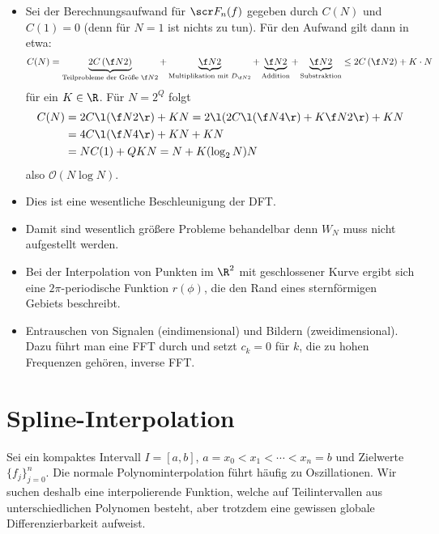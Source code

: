 \documentclass[11pt]{scrbook}
\begin{document}
\begin{nt*}[Aufwandsbetrachtung]
		\begin{itemize}
			\item
				Sei der Berechnungsaufwand für $\scr F_n(f)$ gegeben durch $C(N)$ und $C(1)=0$ (denn für $N=1$ ist nichts zu tun).
				Für den Aufwand gilt dann in etwa:
				\[
					C(N) = \underbrace{2C\left(\f N2\right)}_{\text{Teilprobleme der Größe $\f N2$}} + \underbrace{\f N2}_{\text{Multiplikation mit $D_{\f N2}$}} + \underbrace{\f N2}_{\text{Addition}} + \underbrace{\f N2}_{\text{Substraktion}} \le 2 C\left(\f N2\right) + K\cdot N
				\]
				für ein $K\in \R$.
				Für $N=2^Q$ folgt
				\begin{align*}
					C(N) &= 2C\l(\f N2\r) + KN = 2\l(2C\l(\f N4\r) + K\f N2\r) + KN \\
					&= 4C\l(\f N4\r) + KN + KN \\
					&= NC(1) + QKN = N + K(\log_2 N)N 
				\end{align*}
				also $\mathcal O(N\log N)$.
			\item
				Dies ist eine wesentliche Beschleunigung der DFT.
			\item
				Damit sind wesentlich größere Probleme behandelbar denn $W_N$ muss nicht aufgestellt werden.
		\end{itemize}
\end{nt*}

\begin{nt*}
	\begin{itemize}
		\item
			Bei der Interpolation von Punkten im $\R^2$ mit geschlossener Kurve ergibt sich eine $2\pi$-periodische Funktion $r(\phi)$, die den Rand eines sternförmigen Gebiets beschreibt.
		\item
			Entrauschen von Signalen (eindimensional) und Bildern (zweidimensional).
			Dazu führt man eine FFT durch und setzt $c_k= 0$ für $k$, die zu hohen Frequenzen gehören, inverse FFT.
	\end{itemize}
\end{nt*}


\section{Spline-Interpolation}


Sei ein kompaktes Intervall $I=[a,b]$, $a=x_0<x_1 < \dotsb < x_n = b$ und Zielwerte $\{f_j\}_{j=0}^n$.
Die normale Polynominterpolation führt häufig zu Oszillationen.
Wir suchen deshalb eine interpolierende Funktion, welche auf Teilintervallen aus unterschiedlichen Polynomen besteht, aber trotzdem eine gewissen globale Differenzierbarkeit aufweist.
\end{document}
